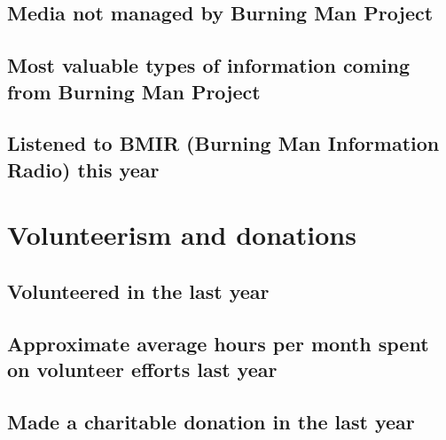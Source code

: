 \documentclass[
]{book}
\begin{document}
\hypertarget{media-not-managed-by-burning-man-project}{%
\subsection{Media not managed by Burning Man Project}\label{media-not-managed-by-burning-man-project}}

\hypertarget{most-valuable-types-of-information-coming-from-burning-man-project}{%
\subsection{Most valuable types of information coming from Burning Man Project}\label{most-valuable-types-of-information-coming-from-burning-man-project}}

\hypertarget{listened-to-bmir-burning-man-information-radio-this-year}{%
\subsection{Listened to BMIR (Burning Man Information Radio) this year}\label{listened-to-bmir-burning-man-information-radio-this-year}}

\hypertarget{volunteerism-and-donations}{%
\section{Volunteerism and donations}\label{volunteerism-and-donations}}

\hypertarget{volunteered-in-the-last-year}{%
\subsection{Volunteered in the last year}\label{volunteered-in-the-last-year}}

\hypertarget{approximate-average-hours-per-month-spent-on-volunteer-efforts-last-year}{%
\subsection{Approximate average hours per month spent on volunteer efforts last year}\label{approximate-average-hours-per-month-spent-on-volunteer-efforts-last-year}}

\hypertarget{made-a-charitable-donation-in-the-last-year}{%
\subsection{Made a charitable donation in the last year}\label{made-a-charitable-donation-in-the-last-year}}
\end{document}
